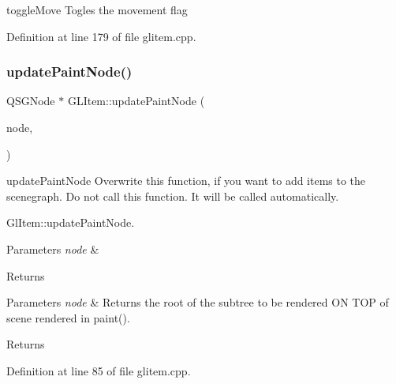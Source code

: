 toggle\+Move Togles the movement flag 



Definition at line 179 of file glitem.\+cpp.

\mbox{\label{class_g_l_item_a3ee5b8ed5321e4b60d233328e3b89d3a}} 
\subsubsection{\texorpdfstring{updatePaintNode()}{updatePaintNode()}}
{\footnotesize\ttfamily Q\+S\+G\+Node $\ast$ G\+L\+Item\+::update\+Paint\+Node (\begin{DoxyParamCaption}\item[{Q\+S\+G\+Node $\ast$}]{node,  }\item[{Update\+Paint\+Node\+Data $\ast$}]{ }\end{DoxyParamCaption})}



update\+Paint\+Node Overwrite this function, if you want to add items to the scenegraph. Do not call this function. It will be called automatically. 

Gl\+Item\+::update\+Paint\+Node.


\begin{DoxyParams}{Parameters}
{\em node} & \\
\hline
\end{DoxyParams}
\begin{DoxyReturn}{Returns}

\end{DoxyReturn}

\begin{DoxyParams}{Parameters}
{\em node} & Returns the root of the subtree to be rendered ON T\+OP of scene rendered in paint(). \\
\hline
\end{DoxyParams}
\begin{DoxyReturn}{Returns}

\end{DoxyReturn}


Definition at line 85 of file glitem.\+cpp.

\mbox{\label{class_g_l_item_ac329bb38182a8921e8f83f6990366648}} 
